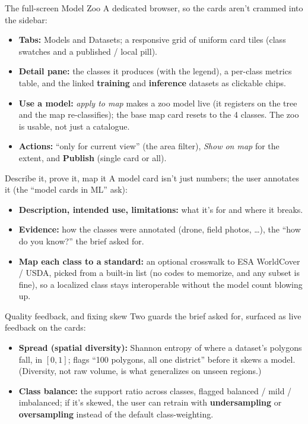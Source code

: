 \documentclass[aspectratio=169]{beamer}
\begin{document}
\begin{frame}{The full-screen Model Zoo}
A dedicated browser, so the cards aren't crammed into the sidebar:
\begin{itemize}
  \item \textbf{Tabs:} Models and Datasets; a responsive grid of uniform card tiles (class
  swatches and a published / local pill).
  \item \textbf{Detail pane:} the classes it produces (with the legend), a per-class metrics table,
  and the linked \textbf{training} and \textbf{inference} datasets as clickable chips.
  \item \textbf{Use a model:} \emph{apply to map} makes a zoo model live (it registers on the tree
  and the map re-classifies); the base map card resets to the 4 classes. The zoo is usable, not just
  a catalogue.
  \item \textbf{Actions:} ``only for current view'' (the area filter), \emph{Show on map} for the
  extent, and \textbf{Publish} (single card or all).
\end{itemize}
\end{frame}

\begin{frame}{Describe it, prove it, map it}
A model card isn't just numbers; the user annotates it (the ``model cards in ML'' ask):
\begin{itemize}
  \item \textbf{Description, intended use, limitations:} what it's for and where it breaks.
  \item \textbf{Evidence:} how the classes were annotated (drone, field photos, \dots), the
  ``how do you know?'' the brief asked for.
  \item \textbf{Map each class to a standard:} an optional crosswalk to ESA WorldCover / USDA, picked
  from a built-in list (no codes to memorize, and any subset is fine), so a localized class stays
  interoperable without the model count blowing up.
\end{itemize}
\end{frame}

\begin{frame}{Quality feedback, and fixing skew}
Two guards the brief asked for, surfaced as live feedback on the cards:
\begin{itemize}
  \item \textbf{Spread (spatial diversity):} Shannon entropy of where a dataset's polygons fall,
  in $[0,1]$; flags ``100 polygons, all one district'' before it skews a model. (Diversity, not raw
  volume, is what generalizes on unseen regions.)
  \item \textbf{Class balance:} the support ratio across classes, flagged balanced / mild /
  imbalanced; if it's skewed, the user can retrain with \textbf{undersampling} or
  \textbf{oversampling} instead of the default class-weighting.
\end{itemize}
\end{frame}
\end{document}
